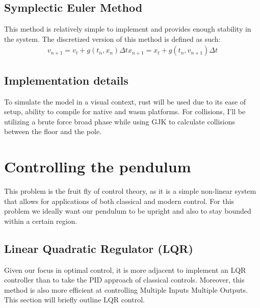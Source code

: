\documentclass{article}
\begin{document}
\subsection{Symplectic Euler Method}
This method is relatively simple to implement and provides enough stability
in the system. The discretized version of this method is defined as such:
\begin{align*}
	v_{n+1} = v_t + g(t_n,x_n) \Delta t
	x_{n+1} = x_t + g(t_n,v_{n+1}) \Delta t
\end{align*}

\subsection{Implementation details}
To simulate the model in a visual context, rust will be used due to its ease of
setup, ability to compile for native and wasm platforms. For collisions,
I'll be utilizing a brute force broad phase while using GJK to calculate collisions
between the floor and the pole.

\section{Controlling the pendulum}
This problem is the fruit fly of control theory, as it is a simple
non-linear system that allows for applications of both classical
and modern control. For this problem we ideally want our pendulum to
be upright and also to stay bounded within a certain region.

\subsection{Linear Quadratic Regulator (LQR)}
Given our focus in optimal control, it is more adjacent to implement
an LQR controller than to take the PID approach of classical controls.
Moreover, this method is also more efficient at controlling Multiple
Inputs Multiple Outputs. This section will briefly outline LQR control.

\end{document}
